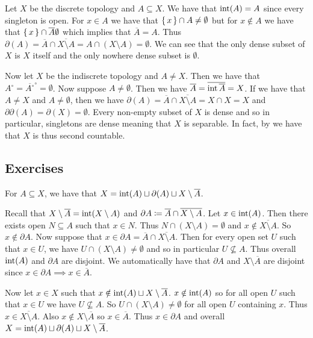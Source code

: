 \documentclass[letterpaper, 11pt]{article}
\begin{document}
\begin{ex}
  Let $X$ be the discrete topology and $A \subseteq X$.
  We have that $\operatorname{int}(A) = A$ since every singleton is open.
  For $x \in A$ we have that $\set{x} \cap A \neq \emptyset$ but for $x \notin A$ we have that $\set{x} \cap \overline{A} \emptyset$ which implies that $\overline{A} = A$.
  Thus $\partial(A) = \overline{A} \cap \overline{X \setminus A} = A \cap (X \setminus A) =
  \emptyset$.
  We can see that the only dense subset of $X$ is $X$ itself and the only nowhere dense subset is $\emptyset$.

  Now let $X$ be the indiscrete topology and $A \neq X$.
  Then we have that $A^{\circ} = \overline{A^{\circ}}^{\circ} = \emptyset$.
  Now suppose $A \neq \emptyset$.
  Then we have $\overline{A} = \overline{\operatorname{int}{\overline{A}}} = X$.
  If we have that $A \neq X$ and $A \neq \emptyset$, then we have $\partial(A) = \overline{A} \cap \overline{X \setminus A} = X \cap X = X$ and $\partial \partial(A) = \partial(X) = \emptyset$.
  Every non-empty subset of $X$ is dense and so in particular, singletons are dense meaning that $X$ is separable.
  In fact, by  we have that $X$ is thus second countable.

\end{ex}

\clearpage

\subsection*{Exercises}

\begin{exercise}
  For $A \subseteq X$, we have that $X = \operatorname{int}(A) \sqcup \partial(A) \sqcup X \setminus \overline{A}$.
\end{exercise}
\begin{pf}
  Recall that $X \setminus \overline{A} = \operatorname{int}(X \setminus A)$ and $\partial A \coloneqq \overline{A} \cap \overline{X \setminus A}$.
  Let $x \in \operatorname{int}(A)$.
  Then there exists open $N \subseteq A$ such that $x \in N$.
  Thus $N \cap (X \setminus A) = \emptyset$ and $x \notin \overline{X \setminus A}$.
  So $x \notin \partial A$.
  Now suppose that $x \in \partial A = \overline{A} \cap \overline{X \setminus A}$.
  Then for every open set $U$ such that $x \in U$, we have $U \cap (X \setminus A) \neq \emptyset$ and so in particular $U \not\subseteq A$.
  Thus overall $\operatorname{int}(A)$ and $\partial A$ are disjoint.
  We automatically have that $\partial A$ and $X \setminus \overline{A}$ are disjoint since $x \in \partial A \implies x \in \overline{A}$.

  Now let $x \in X$ such that $x \notin \operatorname{int}(A) \sqcup X \setminus \overline{A}$.
  $x \notin \operatorname{int}(A)$ so for all open $U$ such that $x \in U$ we have $U \not\subseteq A$.
  So $U \cap (X \setminus A) \neq \emptyset$ for all open $U$ containing $x$.
  Thus $x \in \overline{X \setminus A}$.
  Also $x \notin X \setminus \overline{A}$ so $x \in \overline{A}$.
  Thus $x \in \partial A$ and overall $X = \operatorname{int}(A) \sqcup \partial(A) \sqcup X \setminus \overline{A}$.
\end{pf}
\end{document}
